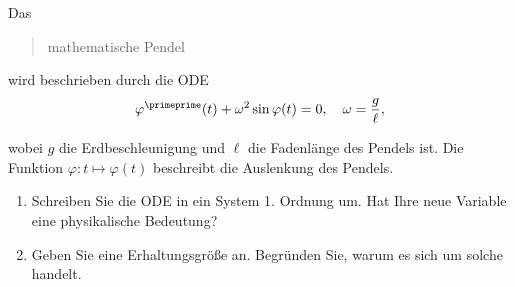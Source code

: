 \begin{exercise}

Das \blockquote{mathematische Pendel} wird beschrieben durch die ODE
\begin{align*}
  \varphi^\primeprime(t) + \omega^2 \sin{\varphi(t)} = 0,
  \quad
  \omega = \frac{g}{\ell},
\end{align*}

wobei $g$ die Erdbeschleunigung und $\ell$ die Fadenlänge des Pendels ist. Die Funktion $\varphi: t \mapsto \varphi(t)$ beschreibt die Auslenkung des Pendels.

\begin{enumerate}[label = \textbf{\alph*)}]

  \item Schreiben Sie die ODE in ein System 1. Ordnung um. Hat Ihre neue Variable eine physikalische
  Bedeutung?

  \item Geben Sie eine Erhaltungsgröße an. Begründen Sie, warum es sich um solche handelt.

\end{enumerate}

\end{exercise}


